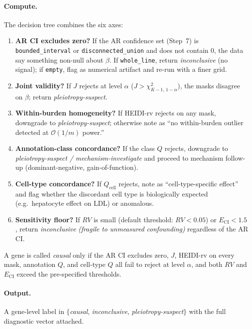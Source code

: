 \documentclass[11pt]{article}
\begin{document}
\paragraph{Compute.} The decision tree combines the six axes:
\begin{enumerate}[label=(D\arabic*)]
\item \textbf{AR CI excludes zero?} If the AR confidence set (Step~7) is \texttt{bounded\_interval} or \texttt{disconnected\_union} and does not contain $0$, the data say something non-null about $\beta$. If \texttt{whole\_line}, return \emph{inconclusive} (no signal); if \texttt{empty}, flag as numerical artifact and re-run with a finer grid.
\item \textbf{Joint validity?} If $J$ rejects at level $\alpha$ ($J > \chi^2_{K-1,\,1-\alpha}$), the masks disagree on $\beta$; return \emph{pleiotropy-suspect}.
\item \textbf{Within-burden homogeneity?} If HEIDI-rv rejects on any mask, downgrade to \emph{pleiotropy-suspect}; otherwise note as ``no within-burden outlier detected at $\mathcal{O}(1/m)$ power.''
\item \textbf{Annotation-class concordance?} If the class $Q$ rejects, downgrade to \emph{pleiotropy-suspect / mechanism-investigate} and proceed to mechanism follow-up (dominant-negative, gain-of-function).
\item \textbf{Cell-type concordance?} If $Q_{\mathrm{cell}}$ rejects, note as ``cell-type-specific effect'' and flag whether the discordant cell type is biologically expected (e.g.\ hepatocyte effect on LDL) or anomalous.
\item \textbf{Sensitivity floor?} If $RV$ is small (default threshold: $RV < 0.05$) or $E_{\mathrm{CI}}<1.5$, return \emph{inconclusive (fragile to unmeasured confounding)} regardless of the AR CI.
\end{enumerate}
A gene is called \emph{causal} only if the AR CI excludes zero, $J$, HEIDI-rv on every mask, annotation $Q$, and cell-type $Q$ all fail to reject at level $\alpha$, and both $RV$ and $E_{\mathrm{CI}}$ exceed the pre-specified thresholds.

\paragraph{Output.} A gene-level label in $\{$\emph{causal}, \emph{inconclusive}, \emph{pleiotropy-suspect}$\}$ with the full diagnostic vector attached.
\end{document}
